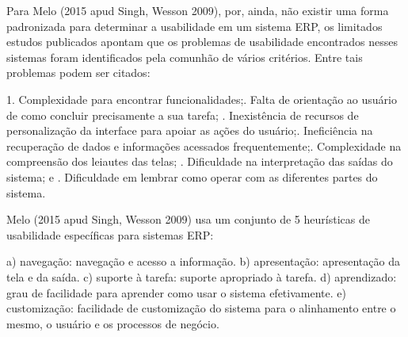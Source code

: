 Para Melo (2015 apud Singh, Wesson 2009), por, ainda, não existir uma forma padronizada para determinar a usabilidade em um sistema ERP, os limitados estudos publicados apontam que os problemas de usabilidade encontrados nesses sistemas foram identificados pela comunhão de vários critérios. Entre tais problemas podem ser citados:\newline

\begin{flushright}
	\begin{minipage}{.96\textwidth}
	1.	Complexidade para encontrar funcionalidades;.	Falta de orientação ao usuário de como concluir precisamente a sua tarefa; 	.	Inexistência de recursos de personalização da interface para apoiar as ações do usuário;.	Ineficiência na recuperação de dados e informações acessados frequentemente;.	Complexidade na compreensão dos leiautes das telas;	.	Dificuldade na interpretação das saídas do sistema; e	.	Dificuldade em lembrar como operar com as diferentes partes do sistema.
	\end{minipage}
\end{flushright}

Melo (2015 apud Singh, Wesson 2009) usa um conjunto de 5 heurísticas de usabilidade específicas para sistemas ERP:
\begin{flushright}
	\begin{minipage}{.96\textwidth}
	a) navegação: navegação e acesso a informação.\newline
	b) apresentação: apresentação da tela e da saída.\newline
	c) suporte à tarefa: suporte apropriado à tarefa.\newline
	d) aprendizado: grau de facilidade para aprender como usar o sistema efetivamente.\newline
	e) customização: facilidade de customização do sistema para o alinhamento entre o mesmo, o usuário e os processos de negócio.		
	\end{minipage}
\end{flushright}

